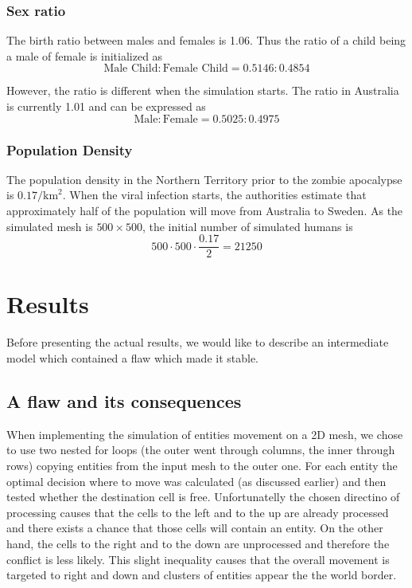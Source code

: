 \documentclass[a4paper]{article}
\begin{document}
\subsubsection{Sex ratio}

The birth ratio between males and females is 1.06. \cite{cia}
Thus the ratio of a child being a male of female is initialized as
$$ \text{Male Child} : \text{Female Child} = 0.5146 : 0.4854 $$

However, the ratio is different when the simulation starts.
The ratio in Australia is currently 1.01 and can be expressed as \cite{cia}
$$ \text{Male} : \text{Female} = 0.5025 : 0.4975 $$

\subsubsection{Population Density}

The population density in the Northern Territory prior to the zombie apocalypse is $0.17/\text{km}^2$. \cite{northernterritory}
When the viral infection starts, the authorities estimate that approximately half of the population will move from Australia to Sweden. \cite{project}
As the simulated mesh is $500 \times 500$, the initial number of simulated humans is
$$ 500 \cdot 500 \cdot \frac{0.17}{2} = 21250 $$

\section{Results}

Before presenting the actual results, we would like to describe an intermediate model which contained a flaw which made it stable.

\subsection{A flaw and its consequences}

When implementing the simulation of entities movement on a 2D mesh, we chose to use two nested for loops (the outer went through columns, the inner through rows) copying entities from the input mesh to the outer one.
For each entity the optimal decision where to move was calculated (as discussed earlier) and then tested whether the destination cell is free.
Unfortunatelly the chosen directino of processing causes that the cells to the left and to the up are already processed and there exists a chance that those cells will contain an entity.
On the other hand, the cells to the right and to the down are unprocessed and therefore the conflict is less likely.
This slight inequality causes that the overall movement is targeted to right and down and clusters of entities appear the the world border.
\end{document}
